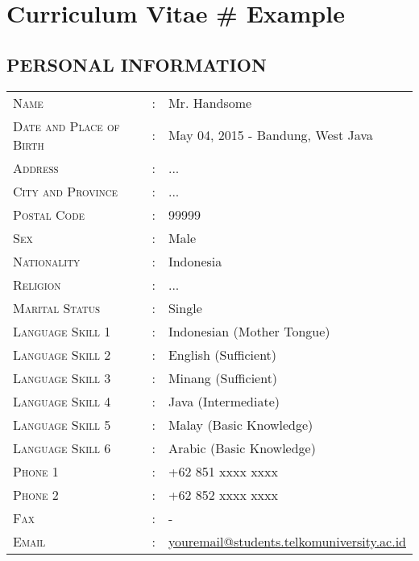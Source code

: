 \chapter{Curriculum Vitae \# Example} %

\label{appendix_cv} %


\section*{PERSONAL INFORMATION}

\begin{tabular}{lll}
	\textsc{Name} & : & Mr. Handsome  \\
	\textsc{Date and Place of Birth} & : & May 04, 2015 - Bandung, West Java \\
	\textsc{Address} & : & ... \\
	\textsc{City and Province} & : & ... \\
	\textsc{Postal Code} & : & 99999 \\
	\textsc{Sex} & : & Male\\
	\textsc{Nationality} & : & Indonesia\\
	\textsc{Religion} & : & ...\\
	\textsc{Marital Status} & : & Single \\
	\textsc{Language Skill 1} & : & Indonesian (Mother Tongue)\\
	\textsc{Language Skill 2} & : & English (Sufficient)\\
	\textsc{Language Skill 3} & : & Minang (Sufficient)\\
	\textsc{Language Skill 4} & : & Java (Intermediate)\\
	\textsc{Language Skill 5} & : & Malay (Basic Knowledge)\\ 
	\textsc{Language Skill 6} & : & Arabic (Basic Knowledge)\\ 	
	\textsc{Phone 1} & : & +62 851 xxxx xxxx\\
	\textsc{Phone 2} & : & +62 852 xxxx xxxx\\
	\textsc{Fax} & : & -\\	
	\textsc{Email} & : & \href{mailto:youremail@students.telkomuniversity.ac.id}{youremail@students.telkomuniversity.ac.id}\\	
\end{tabular}

